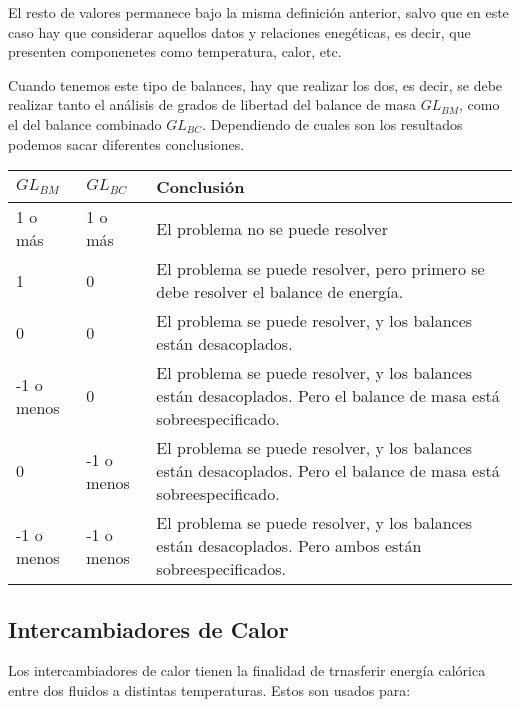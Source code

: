 El resto de valores permanece bajo la misma definición anterior, salvo que en este caso hay que considerar aquellos datos y relaciones enegéticas, es decir, que presenten componenetes como temperatura, calor, etc.

Cuando tenemos este tipo de balances, hay que realizar los dos, es decir, se debe realizar tanto el análisis de grados de libertad del balance de masa $GL_{BM}$, como el del balance combinado $GL_{BC}$.
Dependiendo de cuales son los resultados podemos sacar diferentes conclusiones.

\begin{table}[h]
    \begin{tabular}{|l|l|p{10cm}|}
    \hline
    $GL_{BM}$  & $GL_{BC}$  & Conclusión                                                                                                        \\ \hline
    1 o más    & 1 o más    & El problema no se puede resolver                                                                                  \\ \hline
    1          & 0          & El problema se puede resolver, pero primero se debe resolver el balance de energía.                               \\ \hline
    0          & 0          & El problema se puede resolver, y los balances están desacoplados.                                                 \\ \hline
    -1 o menos & 0          & El problema se puede resolver, y los balances están desacoplados. Pero el balance de masa está sobreespecificado. \\ \hline
    0          & -1 o menos & El problema se puede resolver, y los balances están desacoplados. Pero el balance de masa está sobreespecificado. \\ \hline
    -1 o menos & -1 o menos & El problema se puede resolver, y los balances están desacoplados. Pero ambos están sobreespecificados.            \\ \hline
    \end{tabular}
\end{table}
\clearpage
\subsection{Intercambiadores de Calor}

Los intercambiadores de calor tienen la finalidad de trnasferir energía calórica entre dos fluidos a distintas temperaturas.
Estos son usados para:

